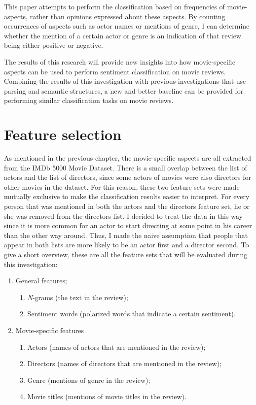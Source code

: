 \documentclass[
10pt, %
a4paper, %
oneside, %
headinclude,footinclude, %
] {book}%
\begin{document}
This paper attempts to perform the classification based on frequencies of movie-aspects, rather than opinions expressed about these aspects. By counting occurrences of aspects such as actor names or mentions of genre, I can determine whether the mention of a certain actor or genre is an indication of that review being either positive or negative. 

The results of this research will provide new insights into how movie-specific aspects can be used to perform sentiment classification on movie reviews. Combining the results of this investigation with previous investigations that use parsing and semantic structures, a new and better baseline can be provided for performing similar classification tasks on movie reviews.

\section{Feature selection}

As mentioned in the previous chapter, the movie-specific aspects are all extracted from the IMDb 5000 Movie Dataset. There is a small overlap between the list of actors and the list of directors, since some actors of movies were also directors for other movies in the dataset. For this reason, these two feature sets were made mutually exclusive to make the classification results easier to interpret. For every person that was mentioned in both the actors and the directors feature set, he or she was removed from the directors list. I decided to treat the data in this way since it is more common for an actor to start directing at some point in his career than the other way around. Thus, I made the naive assumption that people that appear in both lists are more likely to be an actor first and a director second. To give a short overview, these are all the feature sets that will be evaluated during this investigation: 

\begin{enumerate}
\item{General features};
\begin{enumerate}
\item \textit N-grams (the text in the review);
\item Sentiment words (polarized words that indicate a certain sentiment).
\end{enumerate}
\item{Movie-specific features}
\begin{enumerate}
\item Actors (names of actors that are mentioned in the review);
\item Directors (names of directors that are mentioned in the review);
\item Genre (mentions of genre in the review);
\item Movie titles (mentions of movie titles in the review).
\end{enumerate}
\end{enumerate}
\end{document}
